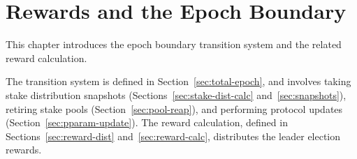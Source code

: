 \section{Rewards and the Epoch Boundary}
\label{sec:epoch}

\newcommand{\UTxOEpState}{\type{UTxOEpState}}
\newcommand{\Acnt}{\type{Acnt}}
\newcommand{\PlReapState}{\type{PlReapState}}
\newcommand{\NewPParamEnv}{\type{NewPParamEnv}}
\newcommand{\Snapshot}{\type{Snapshot}}
\newcommand{\Snapshots}{\type{Snapshots}}
\newcommand{\SnapshotEnv}{\type{SnapshotEnv}}
\newcommand{\SnapshotState}{\type{SnapshotState}}
\newcommand{\NewPParamState}{\type{NewPParamState}}
\newcommand{\EpochState}{\type{EpochState}}
\newcommand{\BlocksMade}{\type{BlocksMade}}
\newcommand{\Stake}{\type{Stake}}
\newcommand{\RewardUpdate}{\type{RewardUpdate}}

\newcommand{\obligation}[4]{\fun{obligation}~ \var{#1}~ \var{#2}~ \var{#3}~ \var{#4}}
\newcommand{\reward}[8]{\fun{reward}
  ~ \var{#1}~ \var{#2}~ \var{#3}~ \var{#4}~ \var{#5}~ \var{#6}~ \var{#7}~ \var{#8}}
\newcommand{\rewardOnePool}[9]{\fun{rewardOnePool}
  ~\var{#1}~\var{#2}~\var{#3}~\var{#4}~\var{#5}~\var{#6}~\var{#7}~\var{#8}~\var{#9}}
\newcommand{\isActive}[4]{\fun{isActive}~ \var{#1}~ \var{#2}~ \var{#3}~ \var{#4}}
\newcommand{\activeStake}[5]{\fun{activeStake}~ \var{#1}~ \var{#2}~ \var{#3}~ \var{#4}~ \var{#5}}
\newcommand{\poolRefunds}[3]{\fun{poolRefunds}~ \var{#1}~ \var{#2}~ \var{#3}}
\newcommand{\poolStake}[3]{\fun{poolStake}~ \var{#1}~ \var{#2}~ \var{#3}}
\newcommand{\stakeDistr}[3]{\fun{stakeDistr}~ \var{#1}~ \var{#2}~ \var{#3}}
\newcommand{\lReward}[4]{\fun{r_{operator}}~ \var{#1}~ \var{#2}~ \var{#3}~ {#4}}
\newcommand{\mReward}[4]{\fun{r_{member}}~ \var{#1}~ \var{#2}~ \var{#3}~ {#4}}
\newcommand{\poolReward}[5]{\fun{poolReward}~\var{#1}~{#2}~\var{#3}~\var{#4}~\var{#5}}
\newcommand{\createRUpd}[3]{\fun{createRUpd}~\var{#1}~\var{#2}~\var{#3}}
\newcommand{\getIR}[1]{\fun{getIR}~\var{#1}}

This chapter introduces the epoch boundary transition system and the related reward calculation.

The transition system is defined in Section~\ref{sec:total-epoch},
and involves taking stake distribution snapshots
(Sections~\ref{sec:stake-dist-calc} and~\ref{sec:snapshots}),
retiring stake pools (Section~\ref{sec:pool-reap}),
and performing protocol updates (Section~\ref{sec:pparam-update}).
The reward calculation, defined in Sections~\ref{sec:reward-dist} and~\ref{sec:reward-calc},
distributes the leader election rewards.


